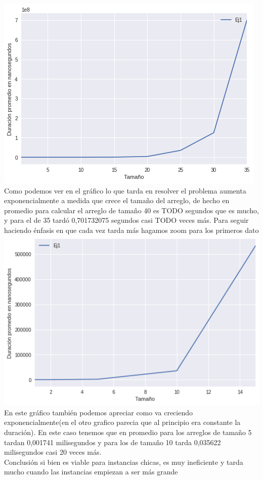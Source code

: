 \includegraphics[scale=0.5]{ej1Random1-40.png}\\
Como podemos ver en el gráfico lo que tarda en resolver el problema aumenta exponencialmente a medida que crece el tamaño del arreglo, de hecho en promedio para calcular el arreglo de tamaño 40 es TODO segundos que es mucho, y para el de 35 tardó 0,701732075 segundos casi TODO veces más. Para seguir haciendo énfasis en que cada vez tarda más hagamos zoom para los primeros dato\\ 
\includegraphics[scale=0.5]{ej1Random1-5.png}\\
En este gráfico también podemos apreciar como va creciendo exponencialmente(en el otro grafico parecia que al principio era constante la duración). En este caso tenemos que en promedio para los arreglos de tamaño 5 tardan 0,001741 milisegundos y para los de tamaño 10 tarda 0,035622 milisegundos casi 20 veces más.\\

Conclusión si bien es viable para instancias chicas, es muy ineficiente y tarda mucho cuando las instancias empiezan a ser más grande

